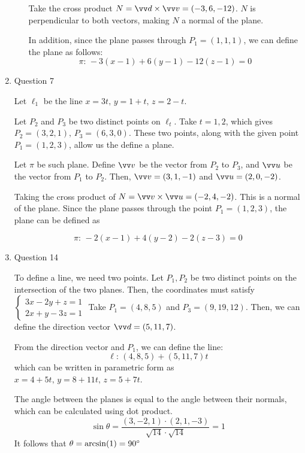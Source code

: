 \documentclass[11pt]{article}
\begin{document}
\begin{enumerate}
\begin{enumerate}
        Take the cross product $N=\vv d \times \vv v = (-3,6,-12)$. $N$ is perpendicular to both vectors, making $N$ a normal of the plane.
        
        In addition, since the plane passes through $P_1=(1,1,1)$, we can define the plane as follows:
        $$
        \pi:\, -3(x-1)+6(y-1)-12(z-1)=0
        $$
    \end{enumerate}

    \item Question 7
    
    Let $\ell_1$ be the line $x=3t,\,y=1+t,\,z=2-t$. 
    
    Let $P_2$ and $P_3$ be two distinct points on $\ell_t$. Take $t=1,2$, which gives $P_2=(3,2,1),\, P_3=(6,3,0)$. These two points, along with the given point $P_1=(1,2,3)$, allow us the define a plane.
    
    Let $\pi$ be such plane. Define $\vv v$ be the vector from $P_2$ to $P_3$, and $\vv u$ be the vector from $P_1$ to $P_2$. Then, $\vv v = (3,1,-1)$ and $\vv u = (2,0,-2)$.
    
    Taking the cross product of $N = \vv v \times \vv u = (-2,4,-2)$. This is a normal of the plane. Since the plane passes through the point $P_1=(1,2,3)$, the plane can be defined as
    
    $$
    \pi:\, -2(x-1)+4(y-2)-2(z-3)=0
    $$
    
    \item Question 14
    
    To define a line, we need two points. Let $P_1,P_2$ be two distinct points on the intersection of the two planes. Then, the coordinates must satisfy 
    $
    \begin{cases}
    3x-2y+z=1 \\
    2x+y-3z=1
    \end{cases}
    $
    Take $P_1=(4,8,5)$ and $P_3=(9,19,12)$. Then, we can define the direction vector $\vv d = (5,11,7)$.
    
    From the direction vector and $P_1$, we can define the line:
    $$
    \ell:\, (4,8,5)+(5,11,7)t
    $$
    which can be written in parametric form as $x=4+5t,\,y=8+11t,\,z=5+7t$.
    
    The angle between the planes is equal to the angle between their normals, which can be calculated using dot product.
    $$
    \sin\theta = \frac{(3,-2,1)\cdot (2,1,-3)}{\sqrt{14} \cdot \sqrt{14}} = 1
    $$
    It follows that $\theta = \arcsin(1) = 90\degree$


\end{enumerate}
\end{document}

